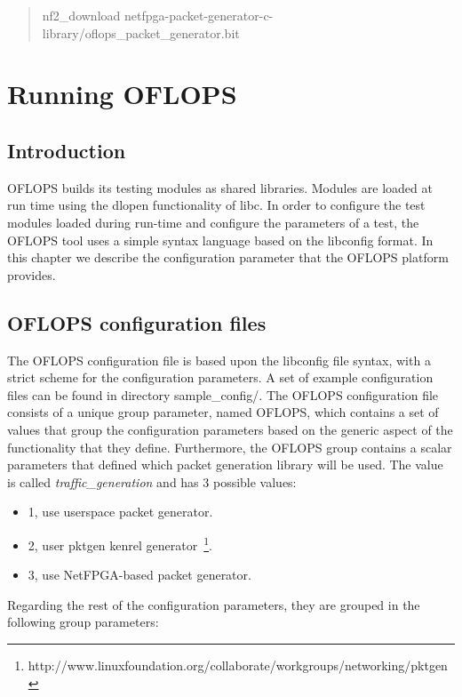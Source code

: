 \documentclass{book}
\begin{document}
          \begin{quote}
          nf2\_download netfpga-packet-generator-c-library/oflops\_packet\_generator.bit
          \end{quote}

          \chapter{Running OFLOPS}

          \section{Introduction}

          OFLOPS builds its testing modules as shared libraries. Modules are 
          loaded at run time using the dlopen functionality of libc. In order to
          configure the test modules loaded during run-time and configure the
          parameters of a test, the OFLOPS tool uses a simple syntax language based on
          the libconfig format. In this chapter we describe the configuration parameter
          that the OFLOPS platform provides.

          \section{OFLOPS configuration files}
          \label{oflops-config-lang}

          The OFLOPS configuration file is based upon the libconfig file syntax, with 
          a strict scheme for the configuration parameters. A set of example configuration 
          files can be found in directory sample\_config/. The OFLOPS configuration file 
          consists of a unique group parameter, named OFLOPS, which contains a set 
          of values that group the configuration parameters based on the generic aspect
          of the functionality that they define. Furthermore, the OFLOPS group contains a 
          scalar parameters that defined which packet generation library will be used. The value is called 
          \emph{traffic\_generation} and has 3 possible values: 
          \begin{itemize}
          \item 1, use userspace packet generator.
          \item 2, user pktgen kenrel generator~\footnote{http://www.linuxfoundation.org/collaborate/workgroups/networking/pktgen}.
          \item 3, use NetFPGA-based packet generator. 
          \end{itemize}
          Regarding the rest of the configuration parameters, they are grouped in 
          the following group parameters: 
\end{document}
